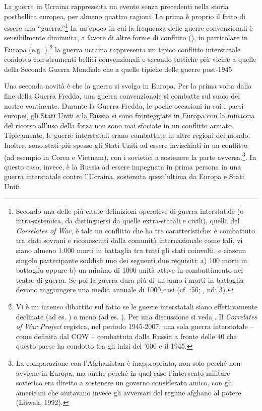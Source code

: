 \documentclass[
]{book}
\begin{document}
La guerra in Ucraina rappresenta un evento senza precedenti nella storia postbellica europea, per almeno quattro ragioni. La prima è proprio il fatto di essere una ``guerra.''\footnote{Secondo una delle più citate definizioni operative di guerra interstatale (o intra-sistemica, da distinguersi da quelle extra-statali e civili), quella del \emph{Correlates of War}, è tale un conflitto che ha tre caratteristiche: è combattuto tra stati sovrani e riconosciuti dalla comunità internazionale come tali, vi siano almeno 1.000 morti in battaglia tra tutti gli stati coinvolti, e ciascun singolo partecipante soddisfi uno dei seguenti due requisiti: a) 100 morti in battaglia oppure b) un minimo di 1000 unità attive in combattimento nel teatro di guerra. Se poi la guerra dura più di un anno i morti in battaglia devono raggiungere una media annuale di 1000 casi (cf. \citet{Small-Singer1982} :56; \citet{Sarkees}, nd: 3).} In un'epoca in cui la frequenza delle guerre convenzionali è sensibilmente diminuita, a favore di altre forme di conflitto (\citet{Sarkees-Wayman-Singer2003}), in particolare in Europa (e.g. \citet{Gaddis1986}) \footnote{Vi è un intenso dibattito sul fatto se le guerre interstatali siano effettivamente declinate (ad es. \citet{Pinker2011}) o meno (ad es. \citet{Braumoeller2019}). Per una discussione si veda \citet{Gleditsch-Pinker-Thayer-Levy-Thompson2013}. Il \emph{Correlates of War Project} registra, nel periodo 1945-2007, una sola guerra interstatale -- come definita dal COW -- combattuta dalla Russia a fronte delle 40 che questo paese ha condotto tra gli inizi del '600 e il 1945.} la guerra ucraina rappresenta un tipico conflitto interstatale condotto con strumenti bellici convenzionali e secondo tattiche più vicine a quelle della Seconda Guerra Mondiale che a quelle tipiche delle guerre post-1945.

Una seconda novità è che la guerra si svolga in Europa. Per la prima volta dalla fine della Guerra Fredda, una guerra convenzionale si combatte sul suolo del nostro continente. Durante la Guerra Fredda, le poche occasioni in cui i paesi europei, gli Stati Uniti e la Russia si sono fronteggiate in Europa con la minaccia del ricorso all'uso della forza non sono mai sfociate in un conflitto armato. Tipicamente, le guerre interstatali erano combattute in altre regioni del mondo, Inoltre, sono stati più spesso gli Stati Uniti ad essere invischiati in un conflitto (ad esempio in Corea e Vietnam), con i sovietici a sostenere la parte avversa.\footnote{La comparazione con l'Afghanistan è inappropriata, non solo perché non avviene in Europa, ma anche perché in quel caso l'intervento militare sovietico era diretto a sostenere un governo considerato amico, con gli americani che aiutavano invece gli avversari del regime afghano al potere (Litwak, 1992).}. In questo caso, invece, è la Russia ad essere impegnata in prima persona in una guerra interstatale contro l'Ucraina, sostenuta quest'ultima da Europa e Stati Uniti.
\end{document}
